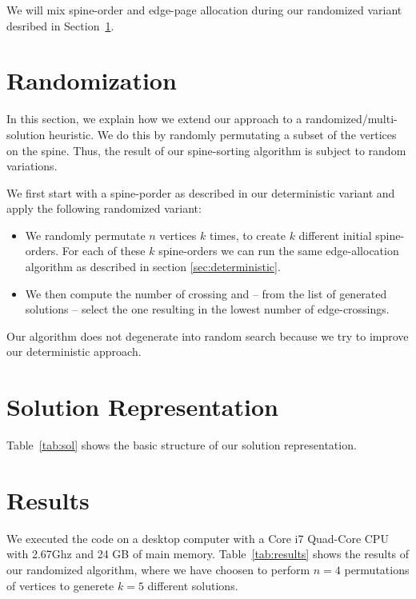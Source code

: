 \documentclass{scrartcl}
\begin{document}
We will mix spine-order and edge-page allocation during our randomized
variant desribed in Section~\ref{sec:randomization}.



\section{Randomization}
\label{sec:randomization}
In this section, we explain how we extend our approach to a
randomized/multi-solution heuristic. We do this by randomly
permutating a subset of the vertices on the spine. Thus, the result of
our spine-sorting algorithm is subject to random variations.

We first start with a spine-porder as described in our deterministic
variant and apply the following randomized variant:

\begin{itemize}
\item We randomly permutate $n$ vertices $k$ times, to create $k$
  different initial spine-orders. For each of these $k$ spine-orders
  we can run the same edge-allocation algorithm as described in
  section \ref{sec:deterministic}.

\item We then compute the number of
crossing and -- from the list of generated solutions -- select the one
resulting in the lowest number of edge-crossings. 
\end{itemize}



Our algorithm does not degenerate into random search because we try to
improve our deterministic approach.


\section{Solution Representation}

 

Table~\ref{tab:sol} shows the basic
structure of our solution representation.

\section{Results}
We executed the code on a desktop computer with a Core i7 Quad-Core
CPU with 2.67Ghz and 24 GB of main memory. Table~\ref{tab:results}
shows the results of our randomized algorithm, where we have choosen
to perform $n=4$ permutations of vertices to generete $k=5$ different
solutions.
\end{document}
